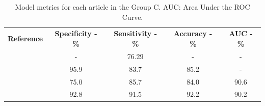\documentclass{article}
\begin{document}
\begin{table}[]
    \centering
    \begin{tabular}{ccccc}\toprule
        \multirow{2}{*}{\textbf{Reference}} & \multirow{2}{*}{\textbf{Specificity - \%}} & \multirow{2}{*}{\textbf{Sensitivity - \%}} & \multirow{2}{*}{\textbf{Accuracy - \%}} & \multirow{2}{*}{\textbf{AUC - \%}} \\
        \\\midrule
        \cite{Bi2017}                       & -                                          & 76.29                                      & -                                       & -                                  \\
        \cite{Bi2022}                       & 95.9                                       & 83.7                                       & 85.2                                    & -                                  \\
        \cite{Kong2022}                     & 75.0                                       & 85.7                                       & 84.0                                    & 90.6                               \\
        \cite{Zheng2020}                    & 92.8                                       & 91.5                                       & 92.2                                    & 90.2                               \\
        \bottomrule
    \end{tabular}
    \caption{Model metrics for each article in the Group C. AUC: Area Under the ROC Curve.}
    \label{tab:res_C}
\end{table}



\end{document}
